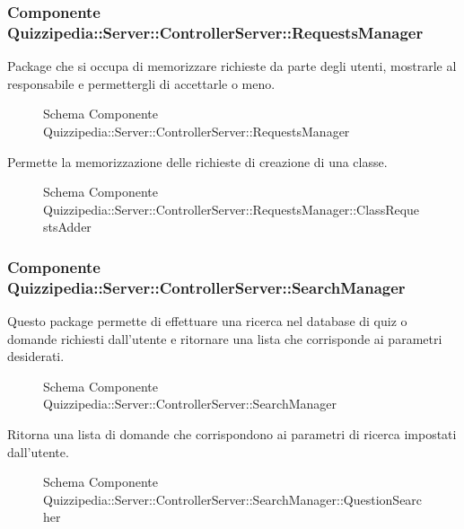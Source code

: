\subsubsection{Componente Quizzipedia::Server::ControllerServer::RequestsManager}
Package che si occupa di memorizzare richieste da parte degli utenti, mostrarle al responsabile e permettergli di accettarle o meno.
\begin{figure}[H]
\centering
\noindent{}
\caption{Schema Componente Quizzipedia::Server::ControllerServer::RequestsManager}
\end{figure}
Permette la memorizzazione delle richieste di creazione di una classe.
\begin{figure}[H]
\centering
\noindent{}
\caption{Schema Componente Quizzipedia::Server::ControllerServer::RequestsManager::ClassRequestsAdder}
\end{figure}
\subsubsection{Componente Quizzipedia::Server::ControllerServer::SearchManager}
Questo package permette di effettuare una ricerca nel database di quiz o domande richiesti dall'utente e ritornare una lista che corrisponde ai parametri desiderati.
\begin{figure}[H]
\centering
\noindent{}
\caption{Schema Componente Quizzipedia::Server::ControllerServer::SearchManager}
\end{figure}
Ritorna una lista di domande che corrispondono ai parametri di ricerca impostati dall'utente.
\begin{figure}[H]
\centering
\noindent{}
\caption{Schema Componente Quizzipedia::Server::ControllerServer::SearchManager::QuestionSearcher}
\end{figure}
